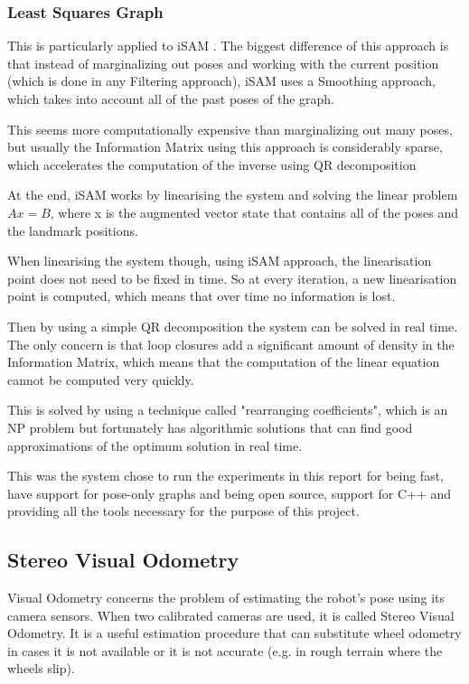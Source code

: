 \documentclass[11pt]{article}
\begin{document}
	\subsubsection{Least Squares Graph}
This is particularly applied to iSAM \cite{Kaess08tro}. The biggest difference of this approach is that instead of marginalizing out poses and working with the current position (which is done in any Filtering approach), iSAM uses a Smoothing approach, which takes into account all of the past poses of the graph.

This seems more computationally expensive than marginalizing out many poses, but usually the Information Matrix using this approach is considerably sparse, which accelerates the computation of the inverse using QR decomposition

At the end, iSAM works by linearising the system and solving the linear problem $Ax = B$, where x is the augmented vector state that contains all of the poses and the landmark positions.

When linearising the system though, using iSAM approach, the linearisation point does not need to be fixed in time. So at every iteration, a new linearisation point is computed, which means that over time no information is lost.

Then by using a simple QR decomposition the system can be solved in real time. The only concern is that loop closures add a significant amount of density in the Information Matrix, which means that the computation of the linear equation cannot be computed very quickly.

This is solved by using a technique called "rearranging  coefficients", which is an NP problem but fortunately has algorithmic solutions that can find good approximations of the optimum solution in real time.

This was the system chose to run the experiments in this report for being fast, have support for pose-only graphs and being open source, support for C++ and providing all the tools necessary for the purpose of this project.

	
	\subsection{Stereo Visual Odometry}
	\label{subs:SVO}

Visual Odometry concerns the problem of estimating the robot's pose using its camera sensors. When two calibrated cameras are used, it is called Stereo Visual Odometry. It is a useful estimation procedure that can substitute wheel odometry in cases it is not available or it is not accurate (e.g. in rough terrain where the wheels slip).
	
\end{document}
